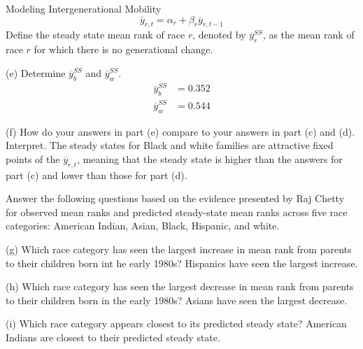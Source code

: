 \documentclass[10pt]{extarticle}
\begin{document}
\begin{problem}{Modeling Intergenerational Mobility}
    \begin{equation}
      \overline{y}_{r,t} = \alpha_r + \beta_r \overline{y}_{r,t-1}
    \end{equation}
    Define the steady state mean rank of race $r$, denoted by $\overline{y}_r^{SS}$, as the mean rank of race $r$ for which there is no generational change.
    \begin{problem}{(e)}
      Determine $\overline{y}_b^{SS}$ and $\overline{y}_{w}^{SS}$.
      \tcblower
      \begin{align*}
        \overline{y}_b^{SS} &= 0.352\\
        \overline{y}_w^{SS} &= 0.544
      \end{align*}
    \end{problem}
    \begin{problem}{(f)}
      How do your answers in part (e) compare to your answers in part (c) and (d). Interpret.
      \tcblower
      The steady states for Black and white families are attractive fixed points of the $\overline{y}_{r,t}$, meaning that the steady state is higher than the answers for part (c) and lower than those for part (d).
    \end{problem}
    Answer the following questions based on the evidence presented by Raj Chetty for observed mean ranks and predicted steady-state mean ranks across five race categories: American Indian, Asian, Black, Hispanic, and white.
    \begin{problem}{(g)}
      Which race category has seen the largest increase in mean rank from parents to their children born int he early 1980s?
      \tcblower
      Hispanics have seen the largest increase.
    \end{problem}
    \begin{problem}{(h)}
      Which race category has seen the largest decrease in mean rank from parents to their children born in the early 1980s?
      \tcblower
      Asians have seen the largest decrease.
    \end{problem}
    \begin{problem}{(i)}
      Which race category appears closest to its predicted steady state?
      \tcblower
      American Indians are closest to their predicted steady state.
    \end{problem}
  \end{problem}
\end{document}
